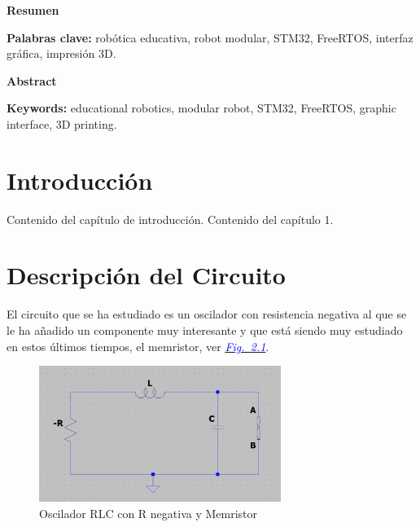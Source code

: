 \documentclass[12pt,a4paper]{report} %
\newcommand{\fref}[1]{\hyperref[#1]{\textcolor{blue}{\textit{Fig.~\ref*{#1}}}}}
\begin{document}
	\clearpage
	\null
	\thispagestyle{empty}
	\newpage

\begin{center}
	\LARGE\textbf{Resumen}
\end{center}
\begin{minipage}{\textwidth}
	\lipsum[1]
	
	\vspace{0.5cm}
	\noindent \textbf{Palabras clave:} robótica educativa, robot modular, STM32, FreeRTOS, interfaz gráfica, impresión 3D.
\end{minipage}

\vspace{1cm}

\begin{center}
	\LARGE\textbf{Abstract}
\end{center}
\begin{minipage}{\textwidth}
	\lipsum[2]
	
	\vspace{0.5cm}
	\noindent \textbf{Keywords:} educational robotics, modular robot, STM32, FreeRTOS, graphic interface, 3D printing.
\end{minipage}
\newpage
	
\tableofcontents
	\chapter{Introducción}
	Contenido del capítulo de introducción. Contenido del capítulo 1.
	
	\chapter{Descripción del Circuito}
	El circuito que se ha estudiado es un oscilador con resistencia negativa al que se le ha añadido un componente muy interesante y que está siendo muy estudiado en estos últimos tiempos, el memristor, ver \fref{fig:-RLCM}.
	
	\begin{figure}[h]
		\centering
		\includegraphics[width=0.7\textwidth]{-RLCM.png}
		\caption{Oscilador RLC con R negativa y Memristor}
		\label{fig:-RLCM}
	\end{figure}
	
\end{document}
